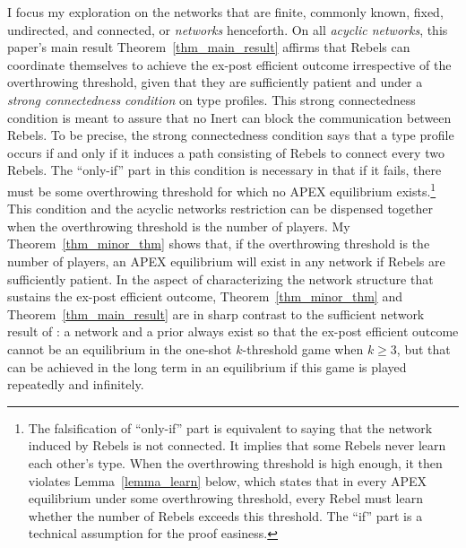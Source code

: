 \documentclass[12pt,letter]{article}
\theoremstyle{definition}
\theoremstyle{remark}
\theoremstyle{claim}
\begin{document}
I focus my exploration on the networks that are finite, commonly known, fixed, undirected, and connected, or \textit{networks} henceforth. On all \textit{acyclic networks}, this paper's main result Theorem~\ref{thm_main_result} affirms that Rebels can coordinate themselves to achieve the ex-post efficient outcome irrespective of the overthrowing threshold, given that they are sufficiently patient and under a \textit{strong connectedness condition} on type profiles. This strong connectedness condition is meant to assure that no Inert can block the communication between Rebels. To be precise, the strong connectedness condition says that a type profile occurs if and only if it induces a path consisting of Rebels to connect every two Rebels. The ``only-if'' part in this condition is necessary in that if it fails, there must be some overthrowing threshold for which no APEX equilibrium exists.\footnote{The falsification of ``only-if'' part is equivalent to saying that the network induced by Rebels is not connected. It implies that some Rebels never learn each other's type. When the overthrowing threshold is high enough, it then violates Lemma~\ref{lemma_learn} below, which states that in every APEX equilibrium under some overthrowing threshold, every Rebel must learn whether the number of Rebels exceeds this threshold. The ``if'' part is a technical assumption for the proof easiness.}
This condition and the acyclic networks restriction can be dispensed together when the overthrowing threshold is the number of players. My Theorem~\ref{thm_minor_thm} shows that, if the overthrowing threshold is the number of players, an APEX equilibrium will exist in any network if Rebels are sufficiently patient. In the aspect of characterizing the network structure that sustains the ex-post efficient outcome, Theorem~\ref{thm_minor_thm} and Theorem~\ref{thm_main_result} are in sharp contrast to the sufficient network result of \citep{Chwe2000}: a network and a prior always exist so that the ex-post efficient outcome cannot be an equilibrium in the one-shot $k$-threshold game when $k\geq 3$, but that can be achieved in the long term in an equilibrium if this game is played repeatedly and infinitely.
\end{document}
